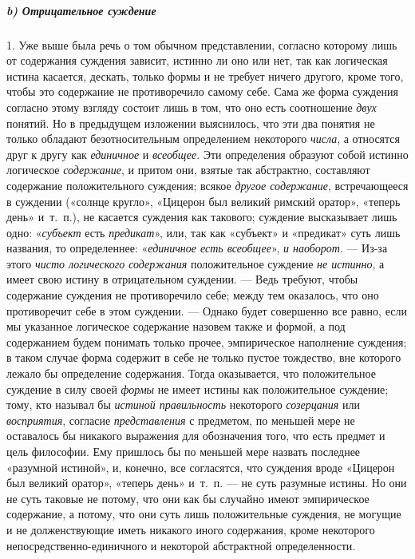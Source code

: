 \documentclass[twoside]{article}
\begin{document}
{{{\subparagraph[b) Отрицательное суждение]{b) Отрицательное суждение}
1. Уже выше была речь о том обычном представлении, согласно
которому лишь от содержания суждения зависит, истинно ли оно или нет, так
как логическая истина касается, дескать, только формы и не требует ничего
другого, кроме того, чтобы это содержание не противоречило самому себе.
Сама же форма суждения согласно этому взгляду состоит лишь в том, что оно
есть соотношение {\em двух}
понятий. Но в предыдущем изложении выяснилось, что эти два
понятия не только обладают безотносительным определением некоторого
{\em числа}, а относятся
друг к другу как {\em единичное}
и {\em всеобщее}.
Эти определения образуют собой истинно логическое
{\em содержание}, и
притом они, взятые так абстрактно, составляют содержание положительного
суждения; всякое {\em другое
содержание}, встречающееся в суждении («солнце кругло»,
«Цицерон был великий римский оратор», «теперь день» и~т.~п.), не касается
суждения как такового; суждение высказывает лишь одно:
«{\em субъект} есть
{\em предикат}», или, так
как «субъект» и «предикат» суть лишь названия, то определеннее:
«{\em единичное есть всеобщее}»,
{\em и наоборот}. — Из-за
этого {\em чисто логического содержания
}положительное суждение
{\em не истинно}, а имеет
свою истину в отрицательном суждении. — Ведь требуют, чтобы
содержание суждения не противоречило себе; между тем оказалось, что оно
противоречит себе в этом суждении. — Однако будет совершенно
все равно, если мы указанное логическое содержание назовем также и формой,
а под содержанием будем понимать только прочее, эмпирическое наполнение
суждения; в таком случае форма содержит в себе не только пустое тождество,
вне которого лежало бы определение содержания. Тогда оказывается, что
положительное суждение в силу своей
{\em формы} не имеет
истины как положительное суждение; тому, кто называл бы
{\em истиной правильность}
некоторого
{\em созерцания} или
{\em восприятия},
согласие
{\em представления} с
предметом, по меньшей мере не оставалось бы никакого выражения для
обозначения того, что есть предмет и цель философии. Ему пришлось бы по
меньшей мере назвать последнее «разумной истиной», и, конечно, все
согласятся, что суждения вроде «Цицерон был великий оратор», «теперь день»
и~т.~п. — не суть разумные истины. Но они не суть таковые не
потому, что они как бы случайно имеют эмпирическое содержание, а потому,
что они суть лишь положительные суждения, не могущие и не долженствующие
иметь никакого иного содержания, кроме некоторого
непосредственно-единичного и некоторой абстрактной определенности.

}}}
\end{document}

